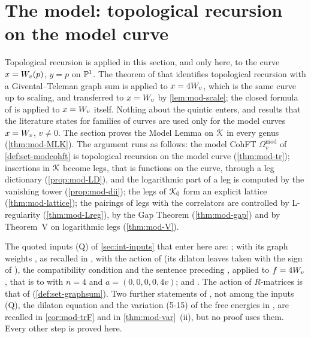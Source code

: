 \section{The model: topological recursion on the model curve}
\label{sec:mod}

Topological recursion is applied in this section, and only here, to the curve $x=W_{v}(p)$, $y=p$ on $\mathbb{P}^1$. The theorem of \cite{DuninBarkowski:2012bw} that identifies topological recursion with a Givental--Teleman graph sum is applied to $x=4W_{v}$, which is the same curve up to scaling, and transferred to $x=W_{v}$ by \cref{lem:mod-scale}; the closed formula of \cite[Thm.~7.1]{ABDKS25} is applied to $x=W_{v}$ itself. Nothing about the quintic enters, and results that the literature states for families of curves are used only for the model curves $x=W_{v}$, $v\neq 0$. The section proves the Model Lemma on $\mathcal{K}$ in every genus (\cref{thm:mod-MLK}). The argument runs as follows: the model CohFT $\Omega^{\mathrm{mod}}_v$ of \cref{def:set-modcohft} is topological recursion on the model curve (\cref{thm:mod-tr}); insertions in $\mathcal{K}$ become legs, that is functions on the curve, through a leg dictionary (\cref{prop:mod-LD}), and the logarithmic part of a leg is computed by the vanishing tower (\cref{prop:mod-dii}); the legs of $\mathcal{K}_{0}$ form an explicit lattice (\cref{thm:mod-lattice}); the pairings of legs with the correlators are controlled by L-regularity (\cref{thm:mod-Lreg}), by the Gap Theorem (\cref{thm:mod-gap}) and by Theorem~V on logarithmic legs (\cref{thm:mod-V}).

The quoted inputs (Q) of \cref{sec:int-inputs} that enter here are: \cite[Def.~4.2 (4-9) with the kernel (4-3), Thm.~4.2, Thm.~4.6, Thm.~5.1 (5-14) with \S5.3 (5-27)--(5-30)]{Eynard:2007kz}; \cite[Thm.~4.1]{DuninBarkowski:2012bw} with its graph weights \cite[\S2.3]{DuninBarkowski:2012bw}, as recalled in \cite[\S2.6, (2-30)--(2-35)]{Dunin-Barkowski:2015caa}, with the action of \cite[\S2.3]{Dunin-Barkowski:2015caa} (its dilaton leaves taken with the sign of \cite[Def.~2.13]{PPZ15}), the compatibility condition \cite[Prop.~4.3 (1)]{Dunin-Barkowski:2015caa} and the sentence preceding \cite[Thm.~8.1]{Dunin-Barkowski:2015caa}, applied to $f=4W_{v}$, that is to \cite[(8-1)]{Dunin-Barkowski:2015caa} with $n=4$ and $a=(0,0,0,0,4v)$; and \cite[Thm.~7.1: (7.6), (7.7), (7.9), (7.10), with the kernel (1.1)]{ABDKS25}. The action of $R$-matrices is that of \cite[Defs.~2.2, 2.5, 2.13]{PPZ15} (\cref{def:set-graphsum}). Two further statements of \cite{Eynard:2007kz}, not among the inputs (Q), the dilaton equation \cite[Thm.~4.7 (4-30)]{Eynard:2007kz} and the variation (5-15) of the free energies in \cite[Thm.~5.1]{Eynard:2007kz}, are recalled in \cref{cor:mod-trF} and in \cref{thm:mod-var}~(ii), but no proof uses them. Every other step is proved here.

